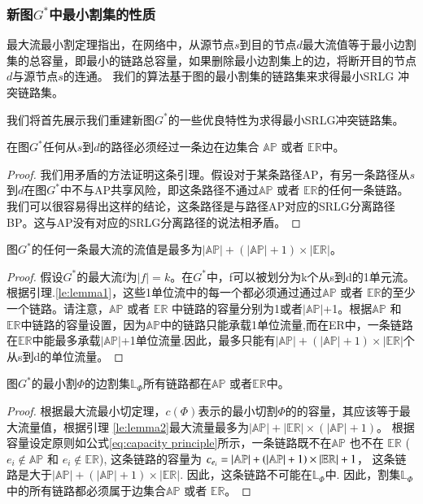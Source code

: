 \subsubsection{新图$G^*$中最小割集的性质}
最大流最小割定理指出，在网络中，从源节点$s$到目的节点$d$最大流值等于最小边割集的总容量，即最小的链路总容量，如果删除最小边割集上的边，将断开目的节点$d$与源节点$s$的连通。 我们的算法基于图的最小割集的链路集来求得最小SRLG 冲突链路集。

我们将首先展示我们重建新图$G^*$的一些优良特性为求得最小SRLG冲突链路集。

\begin{lemma}
\label{le:lemma1}
    在图$G^*$任何从$s$到$d$的路径必须经过一条边在边集合 $\mathbb{AP}$ 或者 $\mathbb{\mathbb{ER}}$中。
\end{lemma}
\begin{proof}
我们用矛盾的方法证明这条引理。假设对于某条路径AP，有另一条路径从$s$到$d$在图$G^*$中不与AP共享风险，即这条路径不通过$\mathbb{AP}$ 或者 $\mathbb{\mathbb{ER}}$的任何一条链路。我们可以很容易得出这样的结论，这条路径是与路径AP对应的SRLG分离路径BP。这与AP没有对应的SRLG分离路径的说法相矛盾。
\end{proof}

\begin{lemma}
\label{le:lemma2}
    图$G^*$的任何一条最大流的流值是最多为$|\mathbb{AP}|+(|\mathbb{AP}|+1)\times|\mathbb{\mathbb{ER}}|$。
\end{lemma}
\begin{proof}
假设$G^*$的最大流f为$|f|=k$。在$G^*$中，f可以被划分为k个从s到d的1单元流。根据引理.\ref{le:lemma1}，这些1单位流中的每一个都必须通过通过$\mathbb{AP}$ 或者 $\mathbb{\mathbb{ER}}$的至少一个链路。请注意，$\mathbb{AP}$ 或者 $\mathbb{\mathbb{ER}}$ 中链路的容量分别为1或者$|\mathbb{AP}|$+1。根据$\mathbb{AP}$ 和 $\mathbb{\mathbb{ER}}$中链路的容量设置，因为$\mathbb{AP}$中的链路只能承载1单位流量,而在ER中，一条链路在$\mathbb{ER}$中能最多承载$|\mathbb{AP}|$+1单位流量.因此，最多只能有$|\mathbb{AP}|+ (|\mathbb{AP}|+1)\times|\mathbb{\mathbb{ER}}|$个从s到d的单位流量。
\end{proof}

\begin{lemma}
\label{le:lemma3}
    图$G^*$的最小割$\Phi$的边割集$\mathbb{L}_{\Phi}$所有链路都在$\mathbb{AP}$ 或者$\mathbb{\mathbb{ER}}$中。
\end{lemma}

\begin{proof}
根据最大流最小切定理，$c(\Phi)$表示的最小切割$\Phi$的的容量，其应该等于最大流量值，根据引理 \ref{le:lemma2}最大流量最多为$|\mathbb{AP}|+ |\mathbb{ER}|\times (|\mathbb{AP}|+1)$。 根据容量设定原则如公式\ref{eq:capacity principle}所示，一条链路既不在$\mathbb{AP}$ 也不在 $\mathbb{ER}$ ($e_i \notin \mathbb{AP}$ 和 $e_i \notin \mathbb{ER}$), 这条链路的容量为 $c_{e_i} = \left| {{\rm\mathbb{AP}}} \right| + \left( {\left| {{\rm\mathbb{AP}}} \right| + 1} \right)\times \left| {{\rm{\mathbb{E}}}{{\rm{\mathbb{R}}}}} \right| + 1$， 这条链路是大于$|\mathbb{AP}|+(|\mathbb{AP}|+1)\times |\mathbb{ER}|$. 因此，这条链路不可能在$\mathbb{L}_{\Phi}$中. 因此，割集$\mathbb{L}_{\Phi}$中的所有链路都必须属于边集合$\mathbb{AP}$ 或者 $\mathbb{ER}$。
\end{proof}

